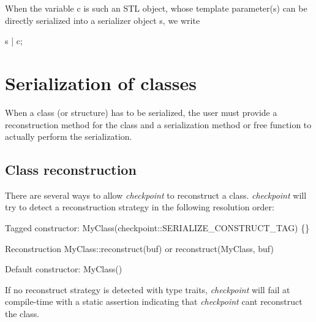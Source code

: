 When the variable {\ttfamily c} is such an S\+TL object, whose template parameter(s) can be directly serialized into a serializer object {\ttfamily s}, we write


\begin{DoxyCode}
s | c;
\end{DoxyCode}
\hypertarget{ckpt_learn_serialize_serialize_class}{}\section{Serialization of classes}\label{ckpt_learn_serialize_serialize_class}
When a class (or structure) has to be serialized, the user must provide a reconstruction method for the class and a serialization method or free function to actually perform the serialization.\hypertarget{ckpt_learn_serialize_reconstruct_class}{}\subsection{Class reconstruction}\label{ckpt_learn_serialize_reconstruct_class}
There are several ways to allow {\itshape checkpoint} to reconstruct a class. {\itshape checkpoint} will try to detect a reconstruction strategy in the following resolution order\+:
\begin{DoxyEnumerate}
\item Tagged constructor\+: {\ttfamily My\+Class(checkpoint\+::\+S\+E\+R\+I\+A\+L\+I\+Z\+E\+\_\+\+C\+O\+N\+S\+T\+R\+U\+C\+T\+\_\+\+T\+A\+G) \{\}}
\end{DoxyEnumerate}
\begin{DoxyEnumerate}
\item Reconstruction {\ttfamily My\+Class\+::reconstruct(buf)} or {\ttfamily reconstruct(\+My\+Class, buf)}
\end{DoxyEnumerate}
\begin{DoxyEnumerate}
\item Default constructor\+: {\ttfamily My\+Class()}
\end{DoxyEnumerate}

If no reconstruct strategy is detected with type traits, {\itshape checkpoint} will fail at compile-\/time with a static assertion indicating that {\itshape checkpoint} can\textquotesingle{}t reconstruct the class.


